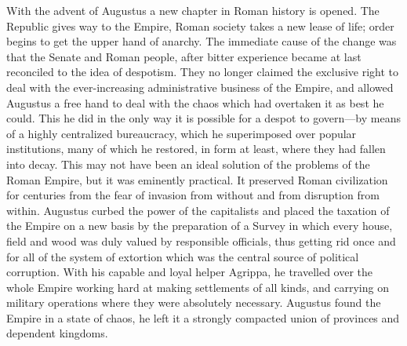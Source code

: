 \documentclass{book}
\begin{document}
With the advent of Augustus a new chapter in Roman history is opened. The Republic gives way to the Empire, Roman society takes a new lease of life; order begins to get the upper hand of anarchy. The immediate cause of the change was that the Senate and Roman people, after bitter experience became at last reconciled to the idea of despotism. They no longer claimed the exclusive right to deal with the ever-increasing administrative business of the Empire, and allowed Augustus a free hand to deal with the chaos which had overtaken it as best he could. This he did in the only way it is possible for a despot to govern—by means of a highly centralized bureaucracy, which he superimposed over popular institutions, many of which he restored, in form at least, where they had fallen into decay. This may not have been an ideal solution of the problems of the Roman Empire, but it was eminently practical. It preserved Roman civilization for centuries from the fear of invasion from without and from disruption from within. Augustus curbed the power of the capitalists and placed the taxation of the Empire on a new basis by the preparation of a Survey in which every house, field and wood was duly valued by responsible officials, thus getting rid once and for all of the system of extortion which was the central source of political corruption. With his capable and loyal helper Agrippa, he travelled over the whole Empire working hard at making settlements of all kinds, and carrying on military operations where they were absolutely necessary. Augustus found the Empire in a state of chaos, he left it a strongly compacted union of provinces and dependent kingdoms.
\end{document}
